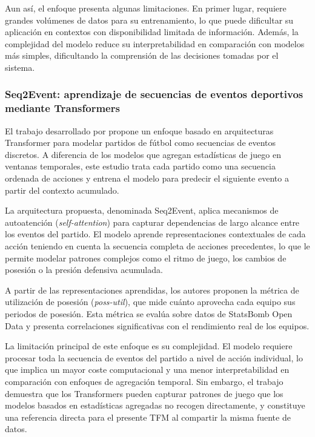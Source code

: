 Aun así, el enfoque presenta algunas limitaciones. En primer lugar, requiere grandes volúmenes de datos para su entrenamiento, lo que puede dificultar su aplicación en contextos con disponibilidad limitada de información. Además, la complejidad del modelo reduce su interpretabilidad en comparación con modelos más simples, dificultando la comprensión de las decisiones tomadas por el sistema.

\subsubsection{Seq2Event: aprendizaje de secuencias de eventos deportivos mediante Transformers}

El trabajo desarrollado por \cite{simpson2022seq2event} propone un enfoque basado en arquitecturas Transformer para modelar partidos de fútbol como secuencias de eventos discretos. A diferencia de los modelos que agregan estadísticas de juego en ventanas temporales, este estudio trata cada partido como una secuencia ordenada de acciones y entrena el modelo para predecir el siguiente evento a partir del contexto acumulado.

La arquitectura propuesta, denominada Seq2Event, aplica mecanismos de autoatención (\textit{self-attention}) para capturar dependencias de largo alcance entre los eventos del partido. El modelo aprende representaciones contextuales de cada acción teniendo en cuenta la secuencia completa de acciones precedentes, lo que le permite modelar patrones complejos como el ritmo de juego, los cambios de posesión o la presión defensiva acumulada.

A partir de las representaciones aprendidas, los autores proponen la métrica de utilización de posesión (\textit{poss-util}), que mide cuánto aprovecha cada equipo sus periodos de posesión. Esta métrica se evalúa sobre datos de StatsBomb Open Data y presenta correlaciones significativas con el rendimiento real de los equipos.

La limitación principal de este enfoque es su complejidad. El modelo requiere procesar toda la secuencia de eventos del partido a nivel de acción individual, lo que implica un mayor coste computacional y una menor interpretabilidad en comparación con enfoques de agregación temporal. Sin embargo, el trabajo demuestra que los Transformers pueden capturar patrones de juego que los modelos basados en estadísticas agregadas no recogen directamente, y constituye una referencia directa para el presente TFM al compartir la misma fuente de datos.

